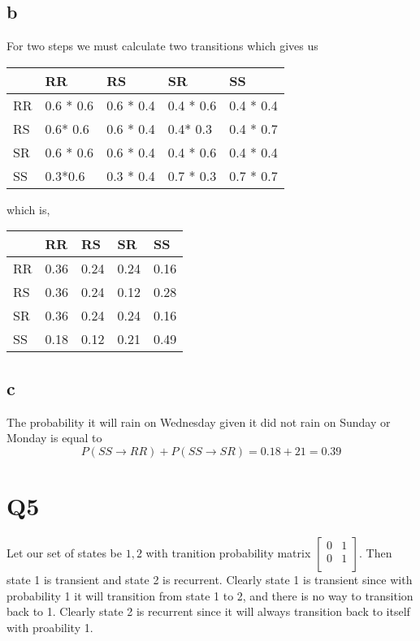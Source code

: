 \documentclass{article}
\begin{document}
\subsection*{b}
For two steps we must calculate two transitions which gives us


\begin{tabular}{| l | l | l | l |l|}
	\hline
     & RR & RS & SR & SS \\ \hline
    RR & 0.6 * 0.6 & 0.6 * 0.4 & 0.4 * 0.6 & 0.4 * 0.4 \\ \hline
    RS & 0.6* 0.6 & 0.6 * 0.4 & 0.4* 0.3 & 0.4 * 0.7 \\ \hline
    SR & 0.6 * 0.6 & 0.6 * 0.4 & 0.4 * 0.6 & 0.4 * 0.4 \\ \hline
    SS & 0.3*0.6 & 0.3 * 0.4 & 0.7 * 0.3 & 0.7 * 0.7 \\ \hline 
\end{tabular}

which is,
\begin{tabular}{| l | l | l | l |l|}
	\hline
     & RR & RS & SR & SS \\ \hline
    RR & 0.36 & 0.24 & 0.24 & 0.16 \\ \hline
    RS & 0.36 & 0.24 & 0.12 & 0.28 \\ \hline
    SR & 0.36 & 0.24 & 0.24 & 0.16 \\ \hline
    SS & 0.18 & 0.12 & 0.21 & 0.49 \\ \hline 
\end{tabular}

\subsection*{c}
The probability it will rain on Wednesday given it did not rain on Sunday or Monday is equal to 
\[
P(SS \rightarrow RR ) + P(SS \rightarrow SR) = 0.18 + 21 = 0.39
\]


\section*{Q5}
Let our set of states be ${1,2}$ with tranition probability matrix
$
\begin{bmatrix}
0 & 1 \\
0 & 1 \\
\end{bmatrix}
$. Then state 1 is transient and state 2 is recurrent. Clearly state 1 is transient since with probability 1 it will transition from state 1 to 2, and there is no way to transition back to 1. Clearly state 2 is recurrent since it will always transition back to itself with proability 1. 
\end{document}
